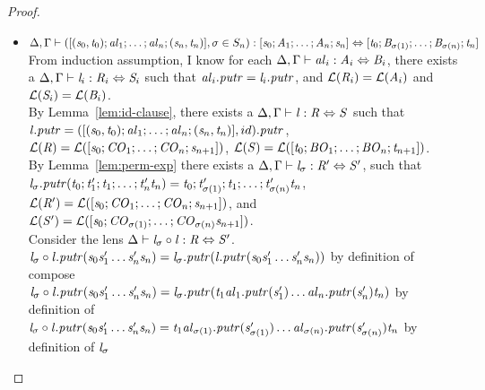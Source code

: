 \begin{lemma}
\begin{proof}
\begin{itemize}
\item$\Delta, \Gamma \vdash ([(\mathit{s}_0,\mathit{t}_0);\mathit{al}_1;\ldots;\mathit{al}_n;(\mathit{s}_n,\mathit{t}_n)],\sigma \in S_n) : [\mathit{s}_0 ; \mathit{A}_1 ; \ldots ; \mathit{A}_n ; \mathit{s}_n] \Leftrightarrow [\mathit{t}_0; \mathit{B}_{\sigma(1)} ; \ldots ; \mathit{B}_{\sigma(n)} ; \mathit{t}_n]$\\
From induction assumption, I know for each $\Delta, \Gamma \vdash \mathit{al}_i : \mathit{A}_i \Leftrightarrow \mathit{B}_i$, there exists a $\Delta, \Gamma \vdash \mathit{l}_i : \mathit{R}_i \Leftrightarrow \mathit{S}_i$ such that $\mathit{al}_i.\mathit{putr}=\mathit{l}_i.\mathit{putr}$,
and $\mathcal{L}(\mathit{R}_i)=\mathcal{L}(\mathit{A}_i)$ and $\mathcal{L}(\mathit{S}_i)=\mathcal{L}(\mathit{B}_i)$.\\
By Lemma~\ref{lem:id-clause}, there exists a $\Delta, \Gamma \vdash \mathit{l} : \mathit{R} \Leftrightarrow \mathit{S}$ such that $\mathit{l}.\mathit{putr}=([(\mathit{s}_0,\mathit{t}_0);\mathit{al}_1;\ldots;\mathit{al}_n;(\mathit{s}_n,\mathit{t}_n)],id).\mathit{putr}$,
$\mathcal{L}(\mathit{R})=\mathcal{L}([\mathit{s}_0;\mathit{CO}_1;\ldots;\mathit{CO}_n;\mathit{s}_{n+1}])$,
$\mathcal{L}(\mathit{S})=\mathcal{L}([\mathit{t}_0;\mathit{BO}_1;\ldots;\mathit{BO}_n;\mathit{t}_{n+1}])$.\\
By Lemma~\ref{lem:perm-exp} there exists a $\Delta, \Gamma \vdash \mathit{l}_{\sigma} : \mathit{R}' \Leftrightarrow \mathit{S}'$,
such that $\mathit{l}_{\sigma}.\mathit{putr}(\mathit{t}_0;\mathit{t}_1';\mathit{t}_1;\ldots;\mathit{t}_n'\mathit{t}_n)=\mathit{t}_0;\mathit{t}_{\sigma(1)}';\mathit{t}_1;\ldots;\mathit{t}_{\sigma(n)}'\mathit{t}_n$,
$\mathcal{L}(\mathit{R}')=\mathcal{L}([\mathit{s}_0;\mathit{CO}_1;\ldots;\mathit{CO}_n;\mathit{s}_{n+1}])$, and
$\mathcal{L}(\mathit{S}')=\mathcal{L}([\mathit{s}_0;\mathit{CO}_{\sigma(1)};\ldots;\mathit{CO}_{\sigma(n)}\mathit{s}_{n+1}])$.\\
Consider the lens $\Delta \vdash \mathit{l}_{\sigma} \circ \mathit{l} : \mathit{R} \Leftrightarrow \mathit{S}'$.\\
$\mathit{l}_{\sigma} \circ \mathit{l}.\mathit{putr}(\mathit{s}_0\mathit{s}_1'\ldots\mathit{s}_n'\mathit{s}_n)=\mathit{l}_{\sigma}.\mathit{putr}(\mathit{l}.\mathit{putr}(\mathit{s}_0\mathit{s}_1'\ldots\mathit{s}_n'\mathit{s}_n))$ by definition of compose\\
$\mathit{l}_{\sigma} \circ \mathit{l}.\mathit{putr}(\mathit{s}_0\mathit{s}_1'\ldots\mathit{s}_n'\mathit{s}_n)=\mathit{l}_{\sigma}.\mathit{putr}(\mathit{t}_1\mathit{al}_1.\mathit{putr}(\mathit{s}_1')\ldots\mathit{al}_n.\mathit{putr}(\mathit{s}_n')\mathit{t}_n)$ by definition of \Lens{}\\
$\mathit{l}_{\sigma} \circ \mathit{l}.\mathit{putr}(\mathit{s}_0\mathit{s}_1'\ldots\mathit{s}_n'\mathit{s}_n)=\mathit{t}_1\mathit{al}_{\sigma(1)}.\mathit{putr}(\mathit{s}_{\sigma(1)}')\ldots\mathit{al}_{\sigma(n)}.\mathit{putr}(\mathit{s}_{\sigma(n)}')\mathit{t}_n$ by definition of $\mathit{l}_{\sigma}$\\

\end{itemize}
\end{proof}
\end{lemma}
